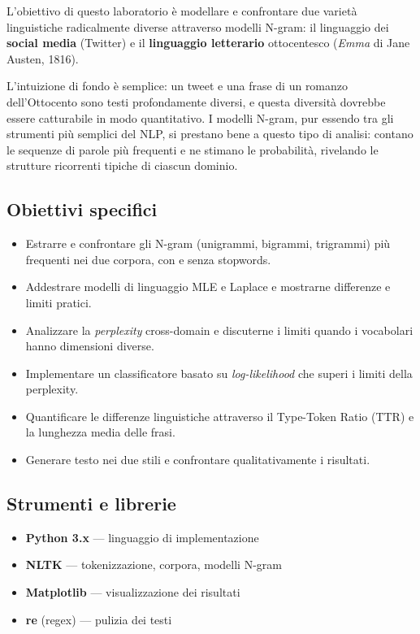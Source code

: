 \documentclass[12pt, a4paper]{article}
\begin{document}
L'obiettivo di questo laboratorio è modellare e confrontare due varietà
linguistiche radicalmente diverse attraverso modelli N-gram: il linguaggio
dei \textbf{social media} (Twitter) e il \textbf{linguaggio letterario}
ottocentesco (\textit{Emma} di Jane Austen, 1816).

L'intuizione di fondo è semplice: un tweet e una frase di un romanzo dell'Ottocento
sono testi profondamente diversi, e questa diversità dovrebbe essere catturabile
in modo quantitativo. I modelli N-gram, pur essendo tra gli strumenti più semplici
del NLP, si prestano bene a questo tipo di analisi: contano le sequenze di parole
più frequenti e ne stimano le probabilità, rivelando le strutture ricorrenti
tipiche di ciascun dominio.

\subsection{Obiettivi specifici}

\begin{itemize}[leftmargin=1.5cm]
    \item Estrarre e confrontare gli N-gram (unigrammi, bigrammi, trigrammi)
          più frequenti nei due corpora, con e senza stopwords.
    \item Addestrare modelli di linguaggio MLE e Laplace e mostrarne
          differenze e limiti pratici.
    \item Analizzare la \textit{perplexity} cross-domain e discuterne i limiti
          quando i vocabolari hanno dimensioni diverse.
    \item Implementare un classificatore basato su \textit{log-likelihood}
          che superi i limiti della perplexity.
    \item Quantificare le differenze linguistiche attraverso il
          Type-Token Ratio (TTR) e la lunghezza media delle frasi.
    \item Generare testo nei due stili e confrontare qualitativamente
          i risultati.
\end{itemize}

\subsection{Strumenti e librerie}

\begin{itemize}[leftmargin=1.5cm]
    \item \textbf{Python 3.x} — linguaggio di implementazione
    \item \textbf{NLTK} --- tokenizzazione, corpora, modelli N-gram
    \item \textbf{Matplotlib} --- visualizzazione dei risultati
    \item \textbf{re} (regex) --- pulizia dei testi
\end{itemize}
\end{document}
